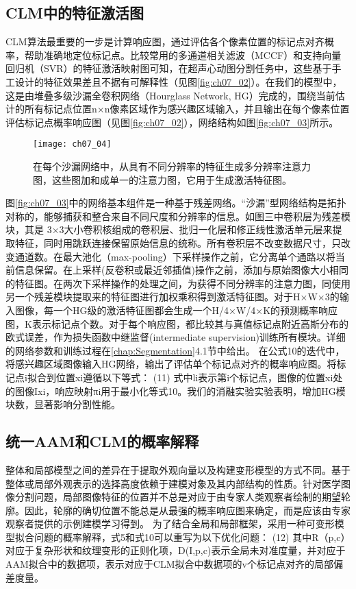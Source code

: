 \subsection{CLM中的特征激活图}
CLM算法最重要的一步是计算响应图，通过评估各个像素位置的标记点对齐概率，帮助准确地定位标记点。比较常用的多通道相关滤波（MCCF）\citep{Galoogahi2016}和支持向量回归机（SVR）\citep{Jan2017}的特征激活映射图可知，在超声心动图分割任务中，这些基于手工设计的特征效果差且不据有可解释性（见图\ref{fig:ch07_02}）。在我们的模型中，这是由堆叠多级沙漏全卷积网络（Hourglass Network, HG）\citep{Newell2016a}完成的，围绕当前估计的所有标记点位置n×n像素区域作为感兴趣区域输入，并且输出在每个像素位置评估标记点概率响应图（见图\ref{fig:ch07_02}），网络结构如图\ref{fig:ch07_03}所示。
\begin{figure}[!htbp]
\centering
\texttt{[image: ch07\_04]}
\caption{在每个沙漏网络中，从具有不同分辨率的特征生成多分辨率注意力图，这些图加和成单一的注意力图，它用于生成激活特征图。}
\label{fig:ch07_04}
\end{figure} 
 

图\ref{fig:ch07_03}中的网络基本组件是一种基于残差网络\citep{he15}。“沙漏”型网络结构是拓扑对称的，能够捕获和整合来自不同尺度和分辨率的信息。如图三中卷积层为残差模块，其是 3×3大小卷积核组成的卷积层、批归一化层和修正线性激活单元层来提取特征，同时用跳跃连接保留原始信息的统称。所有卷积层不改变数据尺寸，只改变通道数。在最大池化（max-pooling）下采样操作之前，它分离单个通路以将当前信息保留。在上采样(反卷积或最近邻插值)操作之前，添加与原始图像大小相同的特征图。在两次下采样操作的处理之间，为获得不同分辨率的注意力图\citep{Chu2017}，同使用另一个残差模块提取来的特征图进行加权乘积得到激活特征图。对于H×W×3的输入图像，每一个HG级的激活特征图都会生成一个H/4×W/4×K的预测概率响应图，K表示标记点个数。对于每个响应图，都比较其与真值标记点附近高斯分布的欧式误差，作为损失函数中继监督(intermediate supervision)训练所有模块。详细的网络参数和训练过程在\ref{chap:Segmentation}4.1节中给出。
在公式10的迭代中，将感兴趣区域图像输入HG网络，输出了评估单个标记点对齐的概率响应图。将标记点i拟合到位置xi遵循以下等式： 
	  	(11)
式中li表示第i个标记点，图像的位置xi处的图像Ixi，响应映射πi用于最小化等式10。我们的消融实验实验表明，增加HG模块数，显著影响分割性能。

\subsection{统一AAM和CLM的概率解释}
整体和局部模型之间的差异在于提取外观向量以及构建变形模型的方式不同。基于整体或局部外观表示的选择高度依赖于建模对象及其内部结构的性质。针对医学图像分割问题，局部图像特征的位置并不总是对应于由专家人类观察者绘制的期望轮廓。因此，轮廓的确切位置不能总是从最强的概率响应图来确定，而是应该由专家观察者提供的示例建模学习得到。
为了结合全局和局部框架，采用一种可变形模型拟合问题的概率解释，式5和式10可以重写为以下优化问题：
    (12)
其中R（p,c）对应于复杂形状和纹理变形的正则化项，D(I,p,c)表示全局未对准度量，并对应于AAM拟合中的数据项，表示对应于CLM拟合中数据项的v个标记点对齐的局部偏差度量。

